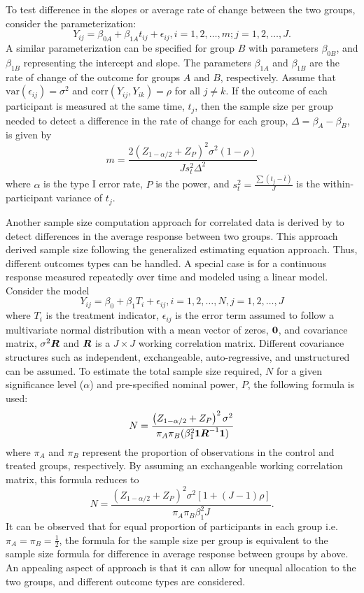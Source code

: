 To test difference in the slopes or average rate of change between the two groups, consider the parameterization:
$$Y_{ij}=\beta_{0A}+\beta_{1A}t_{ij}+\epsilon_{ij}, i=1,2,\dots,m; j=1,2,\dots,J.$$
A similar parameterization can be specified for group $B$ with parameters $\beta_{0B}$, and $\beta_{1B}$ representing the intercept and slope. The parameters $\beta_{1A}$ and $\beta_{1B}$ are the rate of change of the outcome for groups $A$ and $B$, respectively. Assume that $\mbox{var}(\epsilon_{ij})=\sigma^2$ and $\mbox{corr}(Y_{ij},Y_{ik})=\rho$ for all $j\neq k$. If the outcome of each participant is measured at the same time, $t_j$, then the sample size per group needed to detect a difference in the rate of change for each group, $\Delta=\beta_A-\beta_B$, is given by
$$m=\frac{2(Z_{1-\alpha/2}+Z_{P})^2\sigma^2(1-\rho)}{Js^2_t\Delta^2}$$
where $\alpha$ is the type I error rate, $P$ is the power, and $s^2_t=\frac{\sum (t_j-\bar{t})}{J}$ is the within-participant variance of $t_j$. 

Another sample size computation approach for correlated data is derived by \cite{Liu_Liang(1997)} to detect differences in the average response between two groups. This approach derived sample size following the generalized estimating equation \citep{Liang_Zeger(1986)} approach. Thus, different outcomes types can be handled. A special case is for a continuous response measured repeatedly over time and modeled using a linear model. Consider the model $$Y_{ij}=\beta_0+\beta_1T_i+\epsilon_{ij}, i=1,2,\dots, N,j=1,2,\dots,J$$
where $T_i$ is the treatment indicator, $\epsilon_{ij}$ is the error term assumed to follow a multivariate normal distribution with a mean vector of zeros, $\mbox{\boldmath $0$}$, and covariance matrix, $\sigma^2\mbox{\boldmath $R$}$ and $\mbox{\boldmath $R$}$ is a $J\times J$ working correlation matrix. Different covariance structures such as independent, exchangeable, auto-regressive, and unstructured can be assumed. To estimate the total sample size required, $N$ for a given significance level ($\alpha$) and pre-specified nominal power, $P$, the following formula is used:
$$N=\frac{\left(Z_{1-\alpha/2}+Z_{P}\right)^2\sigma^2}{\pi_A\pi_B(\beta_1^2\mbox{\boldmath $1$}\mbox{\boldmath $R$}^{-1}\mbox{\boldmath $1$})}$$
where $\pi_A$ and $\pi_B$ represent the proportion of observations in the control and treated groups, respectively. By assuming an exchangeable working correlation matrix, this formula reduces to
$$N=\frac{\left(Z_{1-\alpha/2}+Z_{P}\right)^2\sigma^2[1+(J-1)\rho]}{\pi_A\pi_B\beta_1^2J}.$$  
It can be observed that for equal proportion of participants in each group i.e. $\pi_A=\pi_B=\frac{1}{2}$,  the formula for the sample size per group is equivalent to the sample size formula for difference in average response between groups by \cite{Diggle_etal(2002)} above. An appealing aspect of \cite{Liu_Liang(1997)} approach is that it can allow for unequal allocation to the two groups, and different outcome types are considered. 

